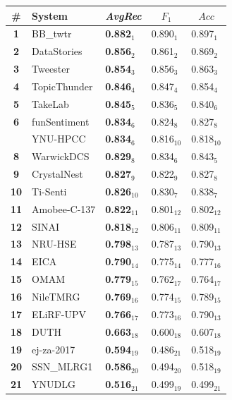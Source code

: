 \begin{table}[h!]
\centering
\begin{small}
\renewcommand{\arraystretch}{1.0}%
\begin{tabular}{|c|l|l|l|l|}
\hline
      \bf \# & \bf System & \multicolumn{1}{c|}{\it AvgRec} & \multicolumn{1}{c|}{$F_1$} & \multicolumn{1}{c|}{$Acc$} \\
\hline
\bf 1 & BB\_twtr & \bf 0.882$_{1}$ & 0.890$_{1}$ & 0.897$_{1}$ \\
\bf 2 & DataStories & \bf 0.856$_{2}$ & 0.861$_{2}$ & 0.869$_{2}$ \\
\bf 3 & Tweester & \bf 0.854$_{3}$ & 0.856$_{3}$ & 0.863$_{3}$ \\
\bf 4 & TopicThunder & \bf 0.846$_{4}$ & 0.847$_{4}$ & 0.854$_{4}$ \\
\bf 5 & TakeLab & \bf 0.845$_{5}$ & 0.836$_{5}$ & 0.840$_{6}$ \\
\bf 6 & funSentiment & \bf 0.834$_{6}$ & 0.824$_{8}$ & 0.827$_{8}$ \\
& YNU-HPCC & \bf 0.834$_{6}$ & 0.816$_{10}$ & 0.818$_{10}$ \\
\bf 8 & WarwickDCS & \bf 0.829$_{8}$ & 0.834$_{6}$ & 0.843$_{5}$ \\
\bf 9 & CrystalNest & \bf 0.827$_{9}$ & 0.822$_{9}$ & 0.827$_{8}$ \\
\bf 10 & Ti-Senti & \bf 0.826$_{10}$ & 0.830$_{7}$ & 0.838$_{7}$ \\
\bf 11 & Amobee-C-137 & \bf 0.822$_{11}$ & 0.801$_{12}$ & 0.802$_{12}$ \\
\bf 12 & SINAI & \bf 0.818$_{12}$ & 0.806$_{11}$ & 0.809$_{11}$ \\
\bf 13 & NRU-HSE & \bf 0.798$_{13}$ & 0.787$_{13}$ & 0.790$_{13}$ \\
\bf 14 & EICA & \bf 0.790$_{14}$ & 0.775$_{14}$ & 0.777$_{16}$ \\
\bf 15 & OMAM & \bf 0.779$_{15}$ & 0.762$_{17}$ & 0.764$_{17}$ \\
\bf 16 & NileTMRG & \bf 0.769$_{16}$ & 0.774$_{15}$ & 0.789$_{15}$ \\
\bf 17 & ELiRF-UPV & \bf 0.766$_{17}$ & 0.773$_{16}$ & 0.790$_{13}$ \\
\bf 18 & DUTH & \bf 0.663$_{18}$ & 0.600$_{18}$ & 0.607$_{18}$ \\
\bf 19 & ej-za-2017 & \bf 0.594$_{19}$ & 0.486$_{21}$ & 0.518$_{19}$ \\
\bf 20 & SSN\_MLRG1 & \bf 0.586$_{20}$ & 0.494$_{20}$ & 0.518$_{19}$ \\
\bf 21 & YNUDLG & \bf 0.516$_{21}$ & 0.499$_{19}$ & 0.499$_{21}$ \\

\end{tabular}
\end{small}
\end{table}
